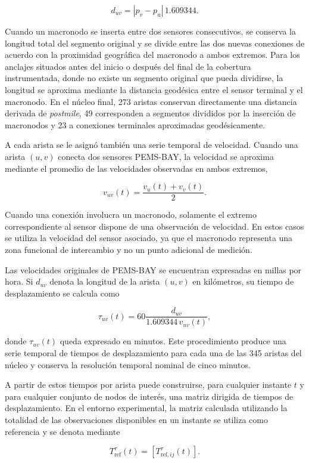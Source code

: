 \documentclass[11pt]{article}
\begin{document}
\[
d_{uv}
=
|p_v-p_u|\,1.609344.
\]

Cuando un macronodo se inserta entre dos sensores consecutivos, se conserva la longitud total del segmento original y se divide entre las dos nuevas conexiones de acuerdo con la proximidad geográfica del macronodo a ambos extremos. Para los anclajes situados antes del inicio o después del final de la cobertura instrumentada, donde no existe un segmento original que pueda dividirse, la longitud se aproxima mediante la distancia geodésica entre el sensor terminal y el macronodo. En el núcleo final, 273 aristas conservan directamente una distancia derivada de \textit{postmile}, 49 corresponden a segmentos divididos por la inserción de macronodos y 23 a conexiones terminales aproximadas geodésicamente.

A cada arista se le asignó también una serie temporal de velocidad. Cuando una arista $(u,v)$ conecta dos sensores PEMS-BAY, la velocidad se aproxima mediante el promedio de las velocidades observadas en ambos extremos,

\[
v_{uv}(t)
=
\frac{v_u(t)+v_v(t)}{2}.
\]

Cuando una conexión involucra un macronodo, solamente el extremo correspondiente al sensor dispone de una observación de velocidad. En estos casos se utiliza la velocidad del sensor asociado, ya que el macronodo representa una zona funcional de intercambio y no un punto adicional de medición.

Las velocidades originales de PEMS-BAY se encuentran expresadas en millas por hora. Si $d_{uv}$ denota la longitud de la arista $(u,v)$ en kilómetros, su tiempo de desplazamiento se calcula como

\[
\tau_{uv}(t)
=
60
\frac{d_{uv}}
     {1.609344\,v_{uv}(t)},
\]

donde $\tau_{uv}(t)$ queda expresado en minutos. Este procedimiento produce una serie temporal de tiempos de desplazamiento para cada una de las 345 aristas del núcleo y conserva la resolución temporal nominal de cinco minutos.

A partir de estos tiempos por arista puede construirse, para cualquier instante $t$ y para cualquier conjunto de nodos de interés, una matriz dirigida de tiempos de desplazamiento. En el entorno experimental, la matriz calculada utilizando la totalidad de las observaciones disponibles en un instante se utiliza como referencia y se denota mediante

\[
T^\tau_{\mathrm{ref}}(t)
=
\left[
T^\tau_{\mathrm{ref},ij}(t)
\right].
\]
\end{document}
